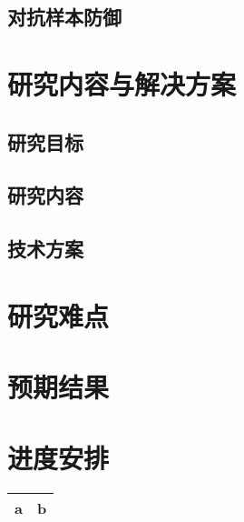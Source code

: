 \section{对抗样本防御}

\vspace{\baselineskip}
{\let\clearpage\relax \chapter{研究内容与解决方案}}

\section{研究目标}

\section{研究内容}

\section{技术方案}

\vspace{\baselineskip}
{\let\clearpage\relax \chapter{研究难点}}

\vspace{\baselineskip}
{\let\clearpage\relax \chapter{预期结果}}

\vspace{\baselineskip}
{\let\clearpage\relax \chapter{进度安排}}
\begin{tabular}{|l|l|}
\hline
a & b \\
\hline
\end{tabular}